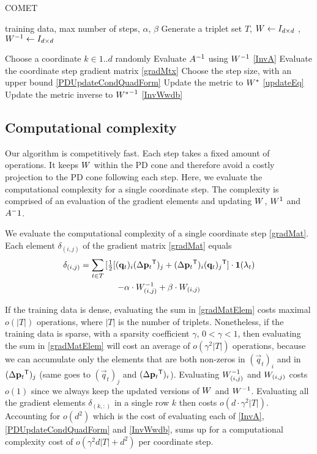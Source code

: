 \documentclass{article}
\begin{document}
\begin{algorithm}[tb]
   \caption{COMET}
   \label{alg:comet}
\begin{algorithmic}[1]
    training data, max number of steps, $\alpha$, $\beta$
   \STATE Generate a triplet set $T$, ${W}  \leftarrow I_{d \times d}$ , ${W}^{-1}  \leftarrow I_{d \times d}$

   \REPEAT 
   \STATE Choose a coordinate $k \in {1..d}$ randomly
   \STATE Evaluate ${A}^{-1}$ using ${W}^{-1}$ \eqref{InvA}
   \STATE Evaluate the coordinate step gradient matrix \eqref{gradMtx}
   \STATE Choose the step size, with an upper bound  \eqref{PDUpdateCondQuadForm}
   \STATE Update the metric to ${{W^*}}$ \eqref{updateEq}
   \STATE Update the metric inverse to ${{W^*}}^{-1}$ \eqref{InvWwdb}
\end{algorithmic}
\end{algorithm}

\subsection{Computational complexity}
Our algorithm is competitively fast. Each step takes a fixed amount of operations. It keeps ${W}$ within the PD cone and therefore avoid a costly projection to the PD cone following each step. Here, we evaluate the computational complexity for a single coordinate step. The complexity is comprised of an evaluation of the gradient elements and updating ${W}$, ${W}^{1}$ and ${A}^-1$.

We evaluate the computational complexity of a single coordinate step \eqref{gradMat}. Each element $\delta_{(i,j)}$ of the gradient matrix \eqref{gradMat} equals
\begin{multline}
\delta_{(i,j)} = \sum\limits_{t\in T}{ [\tfrac{1}{2}[(\mathbf{q}_{t})_i(\Delta\mathbf{p}_{t}{}^\mathsf{T})_j + (\Delta\mathbf{p}_{t}{}^\mathsf{T})_i(\mathbf{q}_{t})_j{}^\mathsf{T}] } \cdot \textbf{1}(\lambda_t)  \\ 
 - \alpha \cdot {W}^{-1}_{(i,j)} + \beta \cdot {W}_{(i,j)}
\label{gradMatElem}
\end{multline}

If the training data is dense, evaluating the sum in \eqref{gradMatElem} costs maximal $o(|T|)$ operations, where $|T|$ is the number of triplets. Nonetheless, if the training data is sparse, with a sparsity coefficient $\gamma$,  $ 0< \gamma <1 $, then evaluating the sum in \eqref{gradMatElem} will cost an average of $o(\gamma^2 |T|)$ operations, because we can accumulate only the elements that are both non-zeros in $(\vec{q}_{t})_i$ and in $(\Delta\mathbf{p}_{t}{}^\mathsf{T})_j  $ (same goes to $(\vec{q}_{t})_j$ and $(\Delta\mathbf{p}_{t}{}^\mathsf{T})_i$). Evaluating ${W}^{-1}_{(i,j)}$ and ${W}_{(i,j)}$ costs $o(1)$ since we always keep the updated versions of ${W}$ and ${W}^{-1}$. Evaluating all the gradient elements $\delta_{(k,:)}$ in a single row $k$ then costs $o(d\cdot \gamma^2 |T|)$. Accounting for $o(d^2)$ which is the cost of evaluating each of \eqref{InvA}, \eqref{PDUpdateCondQuadForm} and \eqref{InvWwdb}, sums up for a computational complexity cost of $o(\gamma^2 d |T| + d^2)$ per coordinate step.
\end{document}
